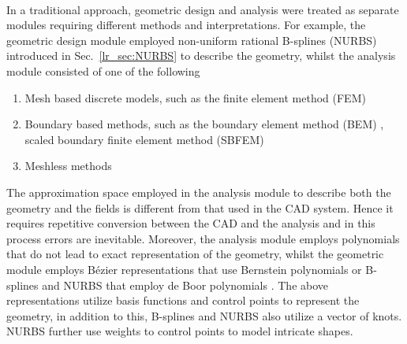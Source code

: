 \paragraph{}
In a traditional approach, geometric design and analysis were treated as separate modules requiring different methods and interpretations.
For example, the geometric design module employed non-uniform rational B-splines (NURBS) introduced in Sec.~\ref{lr_sec:NURBS} to describe the geometry, whilst the analysis module consisted of one of the following
\begin{enumerate}
    \item Mesh based discrete models, such as the finite element method (FEM) \citep{doi:10.1111/j.1467-8667.1989.tb00025.x}
    \item Boundary based methods, such as the boundary element method (BEM) \citep{book}, scaled boundary finite element method (SBFEM) \citep{Son1997}
    \item Meshless methods \citep{article123213eds}
\end{enumerate}
The approximation space employed in the analysis module to describe both the geometry and the fields is different from that used in the CAD system.
Hence it requires repetitive conversion between the CAD and the analysis and in this process errors are inevitable.
Moreover, the analysis module employs polynomials that do not lead to exact representation of the geometry, whilst the geometric module employs Bézier representations that use Bernstein polynomials or B-splines and NURBS that employ de Boor polynomials \citep{Pie1997}.
The above representations utilize basis functions and control points to represent the geometry, in addition to this, B-splines and NURBS also utilize a vector
of knots.
NURBS further use weights to control points to model intricate shapes.

